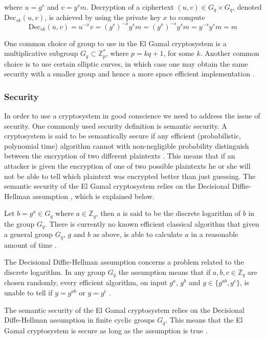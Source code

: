  where $u = g^s$ and $v = y^sm$. Decryption of a ciphertext $(u,v) \in
 G_q \times G_q$, denoted $\mathrm{Dec}_{sk}(u,v)$, is achieved by
 using the private key $x$ to compute
$$
\mathrm{Dec}_{sk}(u,v) = u^{-x}v =
(g^s)^{-x}y^sm = (g^x)^{-s}y^sm = y^{-s}y^sm = m
$$

One common choice of group to use in the El Gamal cryptosystem is a
multiplicative subgroup $G_q \subset \mathbb{Z}_p^*$, where $p = kq +
1$, for some $k$. Another common choice is to use certain elliptic
curves, in which case one may obtain the same security with a smaller
group and hence a more space efficient implementation
\cite[p.~297]{hac}.

\subsubsection{Security}
In order to use a cryptosystem in good conscience we need to address
the issue of security. One commonly used security definition is
semantic security. A cryptosystem is said to be semantically secure if
any efficient (probabilistic, polynomial time) algorithm cannot with
non-negligible probability distinguish between the encryption of two
different plaintexts \cite[p.~306]{hac}. This means that if an
attacker is given the encryption of one of two possible plaintexts he
or she will not be able to tell which plaintext was encrypted better
than just guessing. The semantic security of the El Gamal cryptosystem
relies on the Decisional Diffie-Hellman assumption \cite{wikstrom2},
which is explained below.

Let $b = g^a \in G_q$ where $a \in \mathbb{Z}_q$, then $a$ is said to
be the discrete logarithm of $b$ in the group $G_q$. There is
currently no known efficient classical algorithm that given a general
group $G_q$, $g$ and $b$ as above, is able to calculate $a$ in a
reasonable amount of time \cite[p.~103]{hac}.

The Decisional Diffie-Hellman assumption concerns a problem related to
the discrete logarithm. In any group $G_q$ the assumption means that
if $a,b,c \in \mathbb{Z}_q$ are chosen randomly, every efficient
algorithm, on input $g^a$, $g^b$ and $y \in \{g^{ab}, g^c\}$, is
unable to tell if $y = g^{ab}$ or $y = g^c$ \cite{wikstrom2}.

The semantic security of the El Gamal cryptosystem relies on the
Decisional Diffe-Hellman assumption in finite cyclic groups
$G_q$. This means that the El Gamal cryptosystem is secure as long as
the assumption is true \cite{wikstrom2}. 

